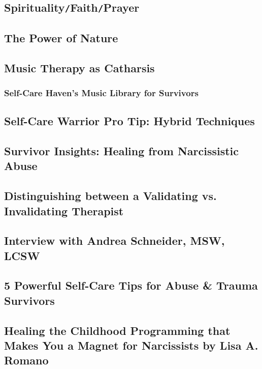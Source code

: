 \documentclass[oneside]{book}
\numberwithin{equation}{section}
\begin{document}
\subsection{Spirituality\texttt{/}Faith\texttt{/}Prayer}

\subsection{The Power of Nature}

\subsection{Music Therapy as Catharsis}

\subsubsection{Self-Care Haven's Music Library for Survivors}

\subsection{Self-Care Warrior Pro Tip: Hybrid Techniques}

\subsection{Survivor Insights: Healing from Narcissistic Abuse}

\subsection{Distinguishing between a Validating vs. Invalidating Therapist}

\subsection{Interview with Andrea Schneider, MSW, LCSW}

\subsection{5 Powerful Self-Care Tips for Abuse \& Trauma Survivors}

\subsection{Healing the Childhood Programming that Makes You a Magnet for Narcissists by Lisa A. Romano}
\end{document}
